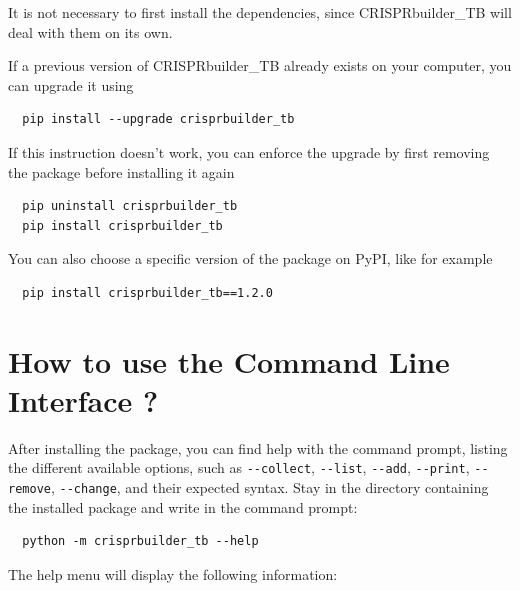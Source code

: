 \documentclass[twoside,a4paper,11pt,frenchb,openany]{report}
\begin{document}
 It is not necessary to first install the dependencies, since CRISPRbuilder\_TB will deal with them on its own.

If a previous version of CRISPRbuilder\_TB already exists on your computer, you can upgrade it using 

\begin{verbatim}
  pip install --upgrade crisprbuilder_tb
\end{verbatim}

If this instruction doesn't work, you can enforce the upgrade by first removing the package before installing it again

\begin{verbatim}
  pip uninstall crisprbuilder_tb
  pip install crisprbuilder_tb
\end{verbatim}

You can also choose a specific version of the package on PyPI, like for example

\begin{verbatim}
  pip install crisprbuilder_tb==1.2.0
\end{verbatim}



    \section{How to use the Command Line Interface
?}\label{how-to-use-the-command-line-interface}

    After installing the package, you can find help with the command prompt,
listing the different available options, such as \texttt{-\/-collect},
\texttt{-\/-list}, \texttt{-\/-add}, \texttt{-\/-print},
\texttt{-\/-remove}, \texttt{-\/-change}, and their expected syntax.
Stay in the directory containing the installed package and write in the
command prompt:

    \begin{verbatim}
  python -m crisprbuilder_tb --help
\end{verbatim}

    The help menu will display the following information:
\end{document}
